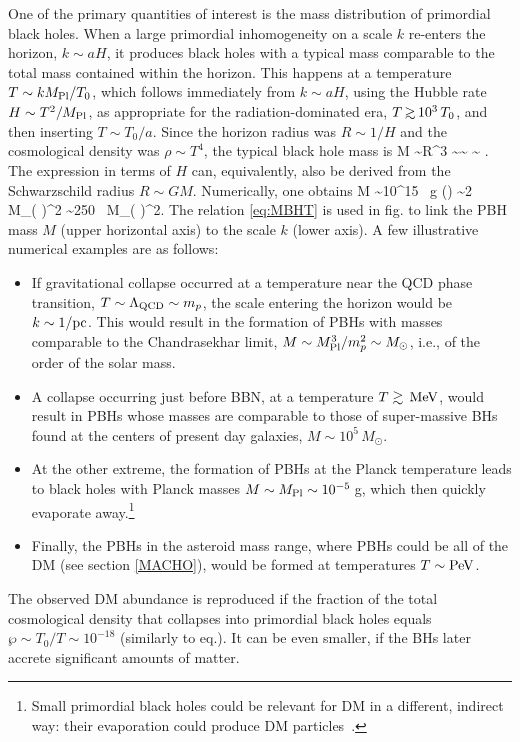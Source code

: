 One of the primary quantities of interest is the mass distribution of primordial black holes.
When a large primordial inhomogeneity on a scale $k$  re-enters the horizon, 
$k \sim aH$, it produces black holes 
with a typical mass comparable to the total mass contained within the horizon.
This happens at a temperature $T \sim k M_{\rm Pl}/T_0$, which follows immediately from $k \sim aH$, using
the Hubble rate
$H \sim T^2/M_{\rm Pl}$, as appropriate for the radiation-dominated era, $T \circa{>} 10^3\, T_0$, and then inserting $T \sim T_0/a$.
Since the horizon radius was $R\sim 1/H$ and the cosmological density was $\rho \sim T^4$, the typical black hole mass is
\beq \label{eq:MBHT}
M \sim \rho R^3 \sim {}\sim
  \sim {} .
 \eeq
The expression in terms of $H$ can, equivalently, also be derived from the Schwarzschild radius $R\sim GM$.
Numerically, one obtains 
\beq 
M \sim 10^{15} \, {\rm g} \left(\right) \sim 2 \, M_\odot \left(  \right)^2 \sim 250 \, M_\odot \left(  \right)^2.
 \eeq
The relation \eqref{eq:MBHT} is used in fig. to link the PBH mass $M$ (upper horizontal axis)
to the scale $k$ (lower axis). 
A few illustrative numerical examples are as follows:
\begin{itemize}
\item[$\circleddash$] If gravitational collapse occurred at a temperature near the QCD phase transition,
$T\sim \Lambda_{\rm QCD} \sim m_p$, 
the scale entering the horizon would be $k \sim 1/{\rm pc}$.
This would result in the formation of PBHs with masses comparable to the Chandrasekhar limit,
$M \sim M_{\rm Pl}^3/m_p^2 \sim M_\odot$, i.e., of the order of the solar mass.

\item[$\circleddash$] 
A collapse occurring just before BBN, at a temperature $T\gtrsim  \,{\rm MeV}$, 
would result in PBHs whose masses are comparable to those of super-massive BHs found
at the centers of present day galaxies, $M\sim 10^5 \, M_\odot$.

\item[$\circleddash$]  
At the other extreme, the formation of PBHs at the Planck temperature leads to black holes with Planck masses $M \sim M_{\rm Pl}\sim 10^{-5}$\,g, which then quickly evaporate away.\footnote{Small primordial black holes could be relevant for DM in a different, indirect way: their evaporation could produce DM particles~\cite{DMfromPBH}.
}
\item[$\circleddash$]  
Finally, the PBHs in the asteroid mass range, where PBHs could be all of the DM (see section \ref{MACHO}),
would be formed at temperatures $T \sim{\rm PeV}$.
\end{itemize}
The observed DM abundance is reproduced if the fraction of the total cosmological
density that collapses into primordial black holes
equals  $\wp \sim T_0/T \sim 10^{-18}$ (similarly to eq.).
It can be even smaller, if the BHs later accrete significant amounts of matter.

